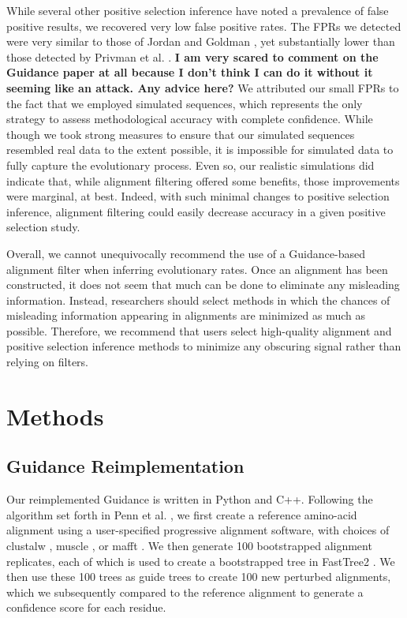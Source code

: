 \documentclass[10pt]{article}
\begin{document}
While several other positive selection inference have noted a prevalence of false positive results, we recovered very low false positive rates. The FPRs we detected were very similar to those of Jordan and Goldman \citet{Jordan2011}, yet substantially lower than those detected by Privman et al. \citet{Privman2012}. \textbf{I am very scared to comment on the Guidance paper at all because I don't think I can do it without it seeming like an attack. Any advice here?} We attributed our small FPRs to the fact that we employed simulated sequences, which represents the only strategy to assess methodological accuracy with complete confidence. While though we took strong measures to ensure that our simulated sequences resembled real data to the extent possible, it is impossible for simulated data to fully capture the evolutionary process. Even so, our realistic simulations did indicate that, while alignment filtering offered some benefits, those improvements were marginal, at best. Indeed, with such minimal changes to positive selection inference, alignment filtering could easily decrease accuracy in a given positive selection study.  

Overall, we cannot unequivocally recommend the use of a Guidance-based alignment filter when inferring evolutionary rates. Once an alignment has been constructed, it does not seem that much can be done to eliminate any misleading information. Instead, researchers should select methods in which the chances of misleading information appearing in alignments are minimized as much as possible. Therefore, we recommend that users select high-quality alignment and positive selection inference methods to minimize any obscuring signal rather than relying on filters.


\section*{Methods}

\subsection*{Guidance Reimplementation}
Our reimplemented Guidance is written in Python and C++. Following the algorithm set forth in Penn et al. \citep{Penn2010}, we first create a reference amino-acid alignment using a user-specified progressive alignment software, with choices of clustalw \citep{Thompson1994}, muscle \citep{Edgar2004}, or mafft \citep{Katoh2002, Katoh2005}. We then generate 100 bootstrapped alignment replicates, each of which is used to create a bootstrapped tree in FastTree2 \citep{Price2010}. We then use these 100 trees as guide trees to create 100 new perturbed alignments, which we subsequently compared to the reference alignment to generate a confidence score for each residue.
\end{document}
